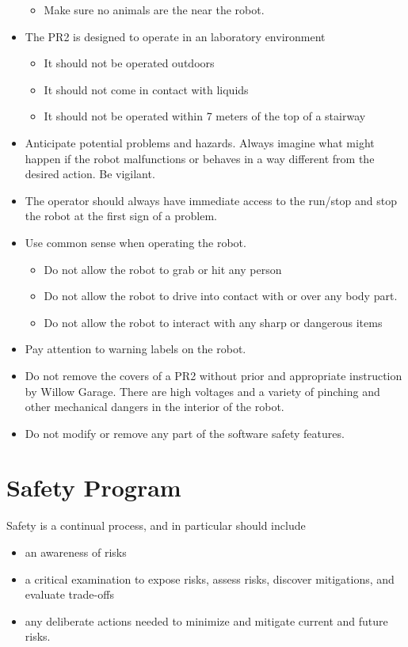 \begin{itemize}
\begin{itemize}
\item Make sure no animals are the near the robot.
\end{itemize}
\item The PR2 is designed to operate in an laboratory environment
\begin{itemize}
\item It should not be operated outdoors
\item It should not come in contact with liquids
\item It should not be operated within 7 meters of the top of a stairway
\end{itemize}
\item Anticipate potential problems and hazards.  Always imagine what might happen if the robot malfunctions or behaves in a way different from the desired action.  Be vigilant.
\item The operator should always have immediate access to the run/stop and stop the robot at the first sign of a problem.
\item Use common sense when operating the robot.
\begin{itemize}
\item Do not allow the robot to grab or hit any person
\item Do not allow the robot to drive into contact with or over any body part.
\item Do not allow the robot to interact with any sharp or dangerous items
\end{itemize}
\item Pay attention to warning labels on the robot.
\item Do not remove the covers of a PR2 without prior and appropriate instruction by Willow Garage. There are high voltages and a variety of pinching and other mechanical dangers in the interior of the robot. 
\item Do not modify or remove any part of the software safety features.
\end{itemize}

\section{Safety Program}

Safety is a continual process, and in particular should include

\begin{itemize}
\item an awareness of risks
\item a critical examination to expose risks, assess risks, discover mitigations, and evaluate trade-offs
\item any deliberate actions needed to minimize and mitigate current and future risks.
\end{itemize}


